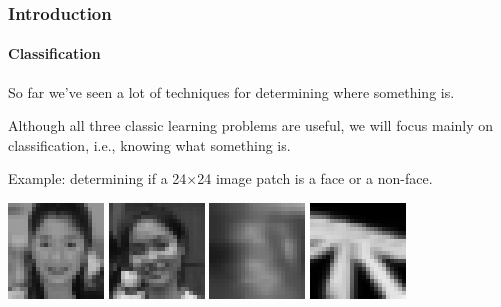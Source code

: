 \documentclass[aspectratio=169]{beamer}
\begin{document}
\begin{frame}
\frametitle{Introduction}
\framesubtitle{Classification}

So far we've seen a lot of techniques for determining \alert{where}
something is.

\medskip

Although all three classic learning problems are useful,
we will focus mainly on classification, i.e., knowing \alert{what}
something is.

\medskip

Example: determining if a 24$\times$24 image patch is a \alert{face}
or a \alert{non-face}.

\medskip

\includegraphics[width=1in]{face1}
\hspace{0.1in}
\includegraphics[width=1in]{face2}
\hspace{0.1in}
\includegraphics[width=1in]{nonface1}
\hspace{0.1in}
\includegraphics[width=1in]{nonface2}

\end{frame}
\end{document}
